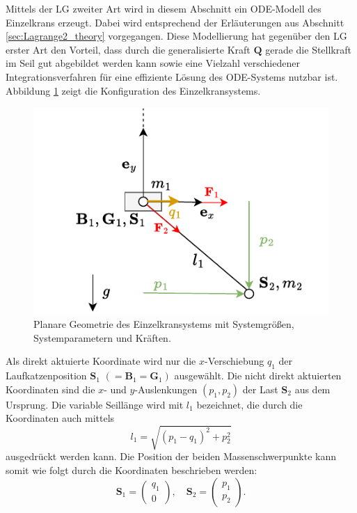 Mittels der LG zweiter Art wird in diesem Abschnitt ein ODE-Modell des Einzelkrans erzeugt. Dabei wird entsprechend der Erläuterungen aus Abschnitt \ref{sec:Lagrange2_theory} vorgegangen. Diese Modellierung hat gegenüber den LG erster Art  den Vorteil, dass durch die generalisierte Kraft $\mathbf{Q}$ gerade die Stellkraft im Seil gut abgebildet werden kann sowie eine Vielzahl verschiedener Integrationsverfahren für eine effiziente Lösung des ODE-Systems nutzbar ist. Abbildung \ref{fig:single_crane_diagram} zeigt die Konfiguration des Einzelkransystems.

\begin{figure}[ht]
	\begin{center}
		\includegraphics[scale=1]{Pictures/ODE_flatness_analysis_single_crane_diagram}
	\end{center}
	\caption[Planare Geometrie des Einzelkransystems]
	{Planare Geometrie des Einzelkransystems mit Systemgrößen, Systemparametern und Kräften.}
	\label{fig:single_crane_diagram}
\end{figure}

Als direkt aktuierte Koordinate wird nur die $x$-Verschiebung $q_1$ der Laufkatzenposition $\mathbf{S}_1$ $(=\mathbf{B}_1 = \mathbf{G}_1)$ ausgewählt. Die nicht direkt aktuierten Koordinaten sind die $x$- und $y$-Auslenkungen $(p_1, p_2)$ der Last $\mathbf{S}_2$ aus dem Ursprung. Die variable Seillänge wird mit $l_1$ bezeichnet, die durch die Koordinaten auch mittels
\begin{equation}
	l_1 = \sqrt{(p_1 - q_1)^2 + p_2^2}
\end{equation}
ausgedrückt werden kann. Die Position der beiden Massenschwerpunkte kann somit wie folgt durch die Koordinaten beschrieben werden:
\begin{equation}
	\mathbf{S}_1 =
	\begin{pmatrix}
		q_1 \\
		0
	\end{pmatrix}, 
	\quad
	\mathbf{S}_2 =
	\begin{pmatrix}
		p_1 \\
		p_2
	\end{pmatrix}.
\end{equation}

